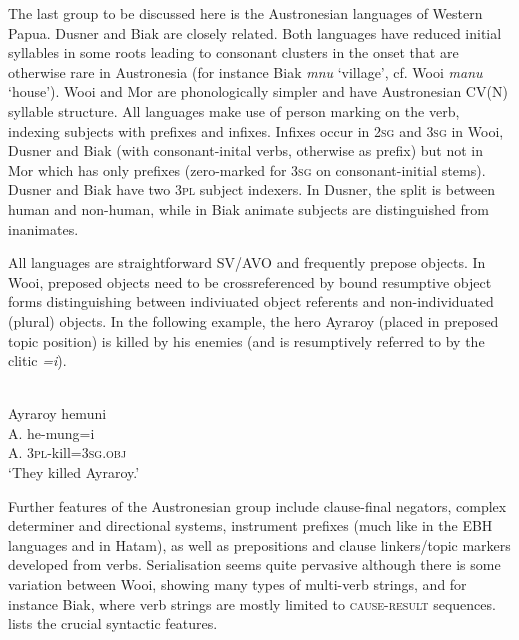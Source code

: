 The last group to be discussed here is the Austronesian languages of Western Papua. Dusner and Biak are closely related. Both languages have reduced initial syllables in some roots leading to consonant clusters in the onset that are otherwise rare in Austronesia (for instance Biak \textit{mnu} `village', cf. Wooi \textit{manu} `house'). Wooi and Mor are phonologically simpler and have Austronesian CV(N) syllable structure. All languages make use of person marking on the verb, indexing subjects with prefixes and infixes. Infixes occur in \textsc{2sg} and \textsc{3sg} in Wooi, Dusner and Biak (with consonant-inital verbs, otherwise as prefix) but not in Mor which has only prefixes (zero-marked for \textsc{3sg} on consonant-initial stems). Dusner and Biak have two \textsc{3pl} subject indexers. In Dusner, the split is between human and non-human, while in Biak animate subjects are distinguished from inanimates.

All languages are straightforward SV/AVO and frequently prepose objects. In Wooi, preposed objects need to be crossreferenced by bound resumptive object forms distinguishing between indiviuated object referents and non-individuated (plural) objects. In the following example, the hero Ayraroy (placed in preposed topic position) is killed by his enemies (and is resumptively referred to by the clitic \textit{=i}).

\ea 
{}\\
\glll Ayraroy hemuni \\
A. he-mung=i \\
A. \textsc{3}\textsc{pl}-kill=\textsc{3}\textsc{sg}.\textsc{obj} \\
\glft `They killed Ayraroy.'
\z

Further features of the Austronesian group include clause-final negators, complex determiner and directional systems, instrument prefixes (much like in the EBH languages and in Hatam), as well as prepositions and clause linkers/topic markers developed from verbs. Serialisation seems quite pervasive although there is some variation between Wooi, showing many types of multi-verb strings, and for instance Biak, where verb strings are mostly limited to \textsc{cause-result} sequences.  lists the crucial syntactic features.


